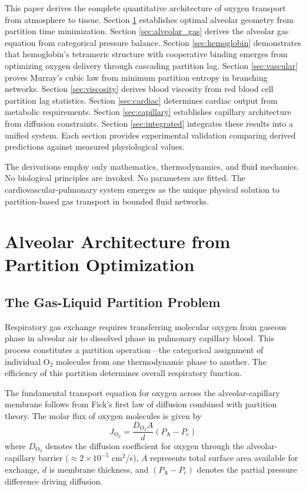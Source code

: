 \documentclass[10pt,twocolumn,a4paper]{article}
\theoremstyle{remark}
\begin{document}
This paper derives the complete quantitative architecture of oxygen transport from atmosphere to tissue. Section \ref{sec:alveolar_architecture} establishes optimal alveolar geometry from partition time minimization. Section \ref{sec:alveolar_gas} derives the alveolar gas equation from categorical pressure balance. Section \ref{sec:hemoglobin} demonstrates that hemoglobin's tetrameric structure with cooperative binding emerges from optimizing oxygen delivery through cascading partition lag. Section \ref{sec:vascular} proves Murray's cubic law from minimum partition entropy in branching networks. Section \ref{sec:viscosity} derives blood viscosity from red blood cell partition lag statistics. Section \ref{sec:cardiac} determines cardiac output from metabolic requirements. Section \ref{sec:capillary} establishes capillary architecture from diffusion constraints. Section \ref{sec:integrated} integrates these results into a unified system. Each section provides experimental validation comparing derived predictions against measured physiological values.

The derivations employ only mathematics, thermodynamics, and fluid mechanics. No biological principles are invoked. No parameters are fitted. The cardiovascular-pulmonary system emerges as the unique physical solution to partition-based gas transport in bounded fluid networks.

\section{Alveolar Architecture from Partition Optimization}
\label{sec:alveolar_architecture}

\subsection{The Gas-Liquid Partition Problem}

Respiratory gas exchange requires transferring molecular oxygen from gaseous phase in alveolar air to dissolved phase in pulmonary capillary blood. This process constitutes a partition operation—the categorical assignment of individual O$_{2}$ molecules from one thermodynamic phase to another. The efficiency of this partition determines overall respiratory function.

The fundamental transport equation for oxygen across the alveolar-capillary membrane follows from Fick's first law of diffusion combined with partition theory. The molar flux of oxygen molecules is given by
\begin{equation}
J_{\mathrm{O}_{2}} = \frac{D_{\mathrm{O}_{2}} A}{d} (P_{\mathrm{A}} - P_{\mathrm{c}})
\label{eq:oxygen_flux}
\end{equation}
where $D_{\mathrm{O}_{2}}$ denotes the diffusion coefficient for oxygen through the alveolar-capillary barrier ($\approx 2 \times 10^{-5}$ cm$^{2}$/s), $A$ represents total surface area available for exchange, $d$ is membrane thickness, and $(P_{\mathrm{A}} - P_{\mathrm{c}})$ denotes the partial pressure difference driving diffusion.
\end{document}
